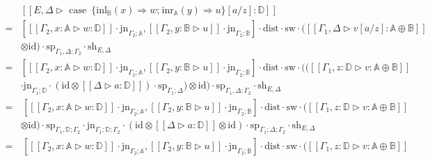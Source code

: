   
  \begin{equation*}
\begin{split}
  &[\![E, \Delta \triangleright \text{ case }  \hspace{2pt}  \{\text{inl}_{\mathbb{B}} (x) \Rightarrow w ; \hspace{1pt} \text{inr}_{\mathbb{A}} (y) \Rightarrow u\} [a/z]: \mathbb{D}]\!] \\
  =& \left[[\![ \Gamma_2, x:\mathbb{A} \triangleright w : \mathbb{D}]\!] \cdot \text{jn}_{ \Gamma_2;\mathbb{A}},[\![ \Gamma_2, y:\mathbb{B} \triangleright u ]\!] \cdot \text{jn}_{ \Gamma_2;\mathbb{B}}\right] \cdot \text{dist} \cdot \text{sw} \cdot ([\![\Gamma_1, \Delta \triangleright v [a/z] : \mathbb{A} \oplus \mathbb{B}  ]\!]  \\
  & \otimes \text{id})  \cdot \text{sp}_{\Gamma_1, \Delta;\Gamma_2} \cdot \text{sh}_{E,\Delta} \\
  =&\left[[\![ \Gamma_2, x:\mathbb{A} \triangleright w : \mathbb{D}]\!] \cdot \text{jn}_{ \Gamma_2;\mathbb{A}},[\![ \Gamma_2, y:\mathbb{B} \triangleright u ]\!] \cdot \text{jn}_{ \Gamma_2;\mathbb{B}}\right] \cdot \text{dist} \cdot \text{sw} \cdot (([\![\Gamma_1, z:\mathbb{D} \triangleright v : \mathbb{A} \oplus \mathbb{B}  ]\!]  \\
  & \cdot \text{jn}_{\Gamma_1; \mathbb{D}} \cdot (\text{id} \otimes [\![ \Delta \triangleright a:\mathbb{D}  ]\!] ) \cdot \text{sp}_{\Gamma_1;\Delta} )\otimes \text{id}) \cdot \text{sp}_{\Gamma_1, \Delta;\Gamma_2} \cdot \text{sh}_{E,\Delta}\\
  = & \hspace{2pt} \left[[\![ \Gamma_2, x:\mathbb{A} \triangleright w : \mathbb{D}]\!] \cdot \text{jn}_{ \Gamma_2;\mathbb{A}},[\![ \Gamma_2, y:\mathbb{B} \triangleright u ]\!] \cdot \text{jn}_{ \Gamma_2;\mathbb{B}}\right] \cdot \text{dist} \cdot \text{sw} \cdot ([\![\Gamma_1, z:\mathbb{D} \triangleright v : \mathbb{A} \oplus \mathbb{B} ]\!]   \\
& \otimes \text{id})  \cdot \text{sp}_{\Gamma_1, \mathbb{D};\Gamma_2} \cdot \text{jn}_{\Gamma_1; \mathbb{D}; \Gamma_2} \cdot (\text{id} \otimes [\![ \Delta \triangleright a:\mathbb{D}   ]\!] \otimes \text{id} ) \cdot    \text{sp}_{\Gamma_1; \Delta;\Gamma_2} \cdot \text{sh}_{E,\Delta}\\
= &  \hspace{2pt} \left[[\![ \Gamma_2, x:\mathbb{A} \triangleright w : \mathbb{D}]\!] \cdot \text{jn}_{ \Gamma_2;\mathbb{A}},[\![ \Gamma_2, y:\mathbb{B} \triangleright u ]\!] \cdot \text{jn}_{ \Gamma_2;\mathbb{B}}\right] \cdot \text{dist} \cdot \text{sw} \cdot ([\![\Gamma_1, z:\mathbb{D} \triangleright v : \mathbb{A} \oplus \mathbb{B} ]\!]   \\ 

\end{split}
\end{equation*}
